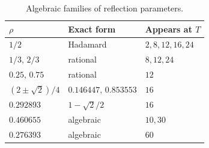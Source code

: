 \begin{table}[h]
\centering
\caption{Algebraic families of reflection parameters.}
\label{tab:algebraic}
\begin{tabular}{lll}
\toprule
$\rho$ & Exact form & Appears at $T$ \\
\midrule
$1/2$          & Hadamard                  & $2,8,12,16,24$ \\
$1/3,\,2/3$    & rational                  & $8,12,24$ \\
$0.25,\,0.75$  & rational                  & $12$ \\
$(2\pm\sqrt2)/4$ & $0.146447,\,0.853553$   & $16$ \\
$0.292893$     & $1-\sqrt2/2$              & $16$ \\
$0.460655$     & algebraic                 & $10,30$ \\
$0.276393$     & algebraic                 & $60$ \\
\bottomrule
\end{tabular}
\end{table}
